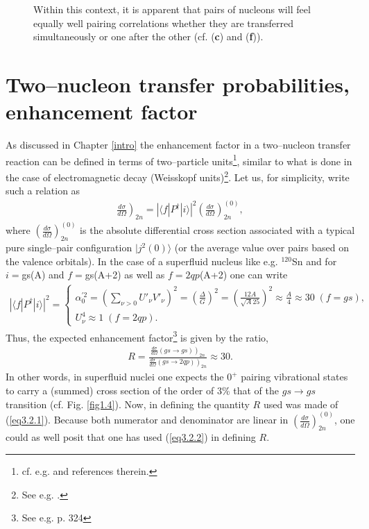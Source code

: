 \begin{figure}
{Within this context, it is apparent that pairs of nucleons will feel equally well pairing correlations whether they are transferred simultaneously or one after the other (cf. (\textbf{c}) and (\textbf{f})).}\label{fig_gamma}
\end{figure}
\section[Transfer probabilities, enhancement factor]{Two--nucleon transfer probabilities, enhancement factor}\label{C3S2}
As discussed in Chapter \ref{intro} the enhancement factor in a two--nucleon transfer reaction can be defined in terms of two--particle units\footnote{cf. e.g. \cite{Broglia:72b,Broglia:73} and references therein.}, similar to what is done in the case of electromagnetic decay (Weisskopf units)\footnote{See e.g. \cite{Bohr:69}.}. Let us, for simplicity, write such a relation as
\begin{align}\label{eq3.2.1}
\left.\frac{d\sigma}{d\Omega}\right)_{2n}=\left|\langle f|P^\dagger|i\rangle \right|^2\left(\frac{d\sigma}{d\Omega}\right)^{(0)}_{2n},
\end{align} 
where $\left(\frac{d\sigma}{d\Omega}\right)^{(0)}_{2n}$ is the absolute differential cross section associated with a typical pure single--pair configuration $|j^2(0)\rangle$ (or the average value over pairs based on the valence orbitals).  In the case of a superfluid nucleus like e.g. $^{120}$Sn and for $i=$gs(A) and $f=$gs(A+2) as well as $f=2qp$(A+2) one can write 
\begin{align}\label{eq3.2.2}
\left|\langle f|P^\dagger|i\rangle \right|^2=\left\{\begin{array}{l}
 \alpha_0^{'2}=\left(\sum_{\nu>0}U'_{\nu}V'_{\nu}\right)^2=\left(\frac{\Delta}{G}\right)^2=\left(\frac{12A}{\sqrt{A}25}\right)^2\approx\frac{A}{4}\approx 30\; (f=gs),\\
 U_\nu^4\approx 1\; (f=2qp).
\end{array} \right.
\end{align} 
Thus, the expected enhancement factor\footnote{See e.g. \cite{Brink:05} p. 324} is given by the ratio, 
\begin{align}
R=\frac{\left.\frac{d\sigma}{d\Omega}(gs\rightarrow gs)\right)_{2n}}{\left.\frac{d\sigma}{d\Omega}(gs\rightarrow 2qp)\right)_{2n}}\approx 30.
\end{align}
In other words, in superfluid nuclei one expects the $0^+$ pairing vibrational states to carry a (summed) cross section of the order of 3\% that of the $gs\rightarrow gs$ transition (cf. Fig. \ref{fig1.4}).
Now, in defining the quantity $R$ used was made of (\ref{eq3.2.1}). Because both numerator and denominator are linear in $\left(\frac{d\sigma}{d\Omega}\right)_{2n}^{(0)}$, one could as well posit that one has used (\ref{eq3.2.2}) in defining $R$.


